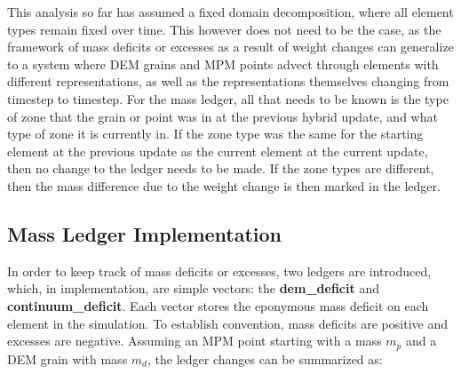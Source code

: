 This analysis so far has assumed a fixed domain decomposition, where all element types remain fixed over time. This however does not need to be the case, as the framework of mass deficits or excesses as a result of weight changes can generalize to a system where DEM grains and MPM points advect through elements with different representations, as well as the representations themselves changing from timestep to timestep. For the mass ledger, all that needs to be known is the type of zone that the grain or point was in at the previous hybrid update, and what type of zone it is currently in. If the zone type was the same for the starting element at the previous update as the current element at the current update, then no change to the ledger needs to be made. If the zone types are different, then the mass difference due to the weight change is then marked in the ledger.

\subsection{Mass Ledger Implementation}
In order to keep track of mass deficits or excesses, two ledgers are introduced, which, in implementation, are simple vectors: the \textbf{dem\_deficit} and \textbf{continuum\_deficit}. Each vector stores the eponymous mass deficit on each element in the simulation. To establish convention, mass deficits are positive and excesses are negative. Assuming an MPM point starting with a mass $m_p$ and a DEM grain with mass $m_d$, the ledger changes can be summarized as:

\def\Zones{\makecell[tl]{Discrete\\ Continuum\\ Hybrid\\ \\ Discrete\\ Continuum\\ Hybrid}}
\def\demdeficit{\textbf{dem\_deficit}}
\def\mpmdeficit{\textbf{mpm\_deficit}}

